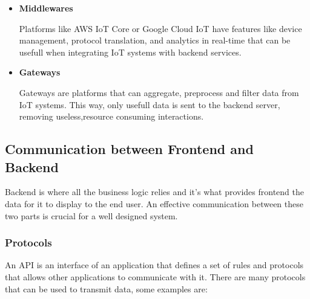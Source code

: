 \begin{itemize}

	\item \textbf{Middlewares}

	      Platforms like AWS IoT Core or Google Cloud IoT have features like
	      device management, protocol translation, and analytics in real-time that
	      can be usefull when integrating IoT systems with backend services.

	\item \textbf{Gateways}

	      Gateways are platforms that can aggregate, preprocess and filter data
	      from IoT systems. This way, only usefull data is sent to the backend server,
	      removing useless,resource consuming interactions.

\end{itemize}

\subsection{Communication between Frontend and Backend}
Backend is where all the business logic relies and it's what provides frontend
the data for it to display to the end user. An effective communication between
these two parts is crucial for a well designed system.
\subsubsection{Protocols}
An API is an interface of an application that defines a set of rules and
protocols that allows other applications to communicate with it. There are many
protocols that can be used to transmit data, some examples are:

